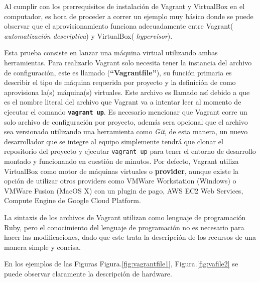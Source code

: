 \documentclass[letterpaper, 12pt, oneside]{article}
\begin{document}
    Al cumplir con los prerrequisitos de instalación de Vagrant y VirtualBox en el computador, es hora de proceder a correr un ejemplo muy básico donde se puede observar que el aprovisionamiento funciona adecuadamente entre Vagrant(\textit{ automatización descriptiva}) y VirtualBox(\textit{ hypervisor}).
    
    Esta prueba consiste en lanzar una máquina virtual utilizando ambas herramientas. Para realizarlo Vagrant solo necesita tener la instancia del archivo de configuración, este es llamado (\textbf{“Vagrantfile”}), su función primaria es describir el tipo de máquina requerida por proyecto y la definición de como aprovisiona la(s) máquina(s) virtuales. Este archivo es llamado así debido a que es el nombre literal del archivo que Vagrant va a intentar leer al momento de ejecutar el comando \textbf{\texttt{vagrant up}}. 
    Es necesario mencionar que Vagrant corre un solo archivo de configuración por proyecto, además sera opcional que el archivo sea versionado utilizando una herramienta como  \textit{Git}, de esta manera, un nuevo desarrollador que se integre al equipo simplemente tendrá que clonar el repositorio del proyecto y ejecutar \texttt{vagrant up} para tener el entorno de desarrollo montado y funcionando en cuestión de minutos. Por defecto, Vagrant utiliza VirtualBox como motor de máquinas virtuales o \textbf{provider}, aunque existe la opción de utilizar otros providers como VMWare Workstation (Windows) o VMWare Fusion (MacOS X) con un plugin de pago, AWS EC2 Web Services, Compute Engine de Google Cloud Platform.
    
    La sintaxis de los archivos de Vagrant utilizan como lenguaje de programación Ruby, pero el conocimiento del lenguaje de programación no es necesario para hacer las modificaciones, dado que este trata la descripción de los recursos de una manera simple y concisa. 
    
    En los ejemplos de las Figuras  Figura.\ref{fig:vagrantfile1},  Figura.\ref{fig:vafile2} se puede observar claramente la descripción de hardware.
    
\end{document}
